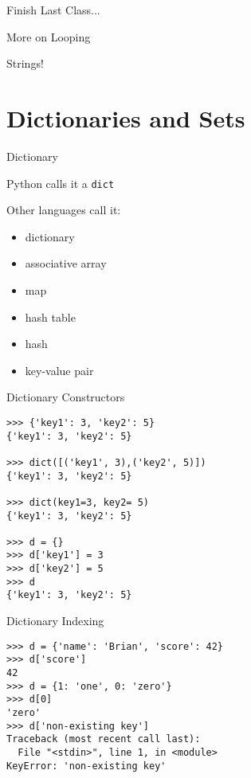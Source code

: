 \documentclass{beamer}
\begin{document}
\begin{frame}{Finish Last Class...}

  \vfill
  {\Large More on Looping}

  \vfill
  {\Large Strings!}

  \vfill

\end{frame}

\section{Dictionaries and Sets}

\begin{frame}[fragile]{Dictionary}

{\Large Python calls it a \verb|dict| }

\vfill
{\Large Other languages call it:}
\begin{itemize}
  \item dictionary
  \item associative array
  \item map
  \item hash table
  \item hash
  \item key-value pair
\end{itemize}

\vfill

\end{frame} 

\begin{frame}[fragile]{Dictionary Constructors}

\begin{verbatim}
>>> {'key1': 3, 'key2': 5}
{'key1': 3, 'key2': 5}

>>> dict([('key1', 3),('key2', 5)])
{'key1': 3, 'key2': 5}

>>> dict(key1=3, key2= 5)
{'key1': 3, 'key2': 5}

>>> d = {}
>>> d['key1'] = 3
>>> d['key2'] = 5
>>> d
{'key1': 3, 'key2': 5}
\end{verbatim}

\end{frame} 

\begin{frame}[fragile]{Dictionary Indexing}

\begin{verbatim}
>>> d = {'name': 'Brian', 'score': 42}
>>> d['score']
42
>>> d = {1: 'one', 0: 'zero'}
>>> d[0]
'zero'
>>> d['non-existing key']
Traceback (most recent call last):
  File "<stdin>", line 1, in <module>
KeyError: 'non-existing key'
\end{verbatim}

\end{frame} 
\end{document}
